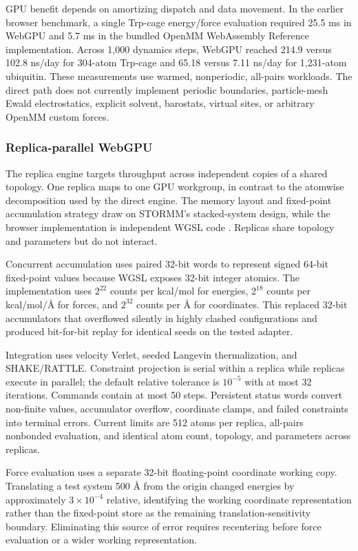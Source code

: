 \documentclass[11pt]{article}
\begin{document}
\begin{small}
GPU benefit depends on amortizing dispatch and data movement. In the earlier browser benchmark, a single Trp-cage energy/force evaluation required 25.5 ms in WebGPU and 5.7 ms in the bundled OpenMM WebAssembly Reference implementation. Across 1,000 dynamics steps, WebGPU reached 214.9 versus 102.8 ns/day for 304-atom Trp-cage and 65.18 versus 7.11 ns/day for 1,231-atom ubiquitin. These measurements use warmed, nonperiodic, all-pairs workloads. The direct path does not currently implement periodic boundaries, particle-mesh Ewald electrostatics, explicit solvent, barostats, virtual sites, or arbitrary OpenMM custom forces.

\subsubsection{Replica-parallel WebGPU}

The replica engine targets throughput across independent copies of a shared topology. One replica maps to one GPU workgroup, in contrast to the atomwise decomposition used by the direct engine. The memory layout and fixed-point accumulation strategy draw on STORMM's stacked-system design, while the browser implementation is independent WGSL code \citep{cerutti2024stormm}. Replicas share topology and parameters but do not interact.

Concurrent accumulation uses paired 32-bit words to represent signed 64-bit fixed-point values because WGSL exposes 32-bit integer atomics. The implementation uses $2^{22}$ counts per kcal/mol for energies, $2^{18}$ counts per kcal/mol/\AA{} for forces, and $2^{32}$ counts per \AA{} for coordinates. This replaced 32-bit accumulators that overflowed silently in highly clashed configurations and produced bit-for-bit replay for identical seeds on the tested adapter.

Integration uses velocity Verlet, seeded Langevin thermalization, and SHAKE/RATTLE. Constraint projection is serial within a replica while replicas execute in parallel; the default relative tolerance is $10^{-5}$ with at most 32 iterations. Commands contain at most 50 steps. Persistent status words convert non-finite values, accumulator overflow, coordinate clamps, and failed constraints into terminal errors. Current limits are 512 atoms per replica, all-pairs nonbonded evaluation, and identical atom count, topology, and parameters across replicas.

Force evaluation uses a separate 32-bit floating-point coordinate working copy. Translating a test system 500 \AA{} from the origin changed energies by approximately $3 \times 10^{-4}$ relative, identifying the working coordinate representation rather than the fixed-point store as the remaining translation-sensitivity boundary. Eliminating this source of error requires recentering before force evaluation or a wider working representation.


\end{small}
\end{document}
